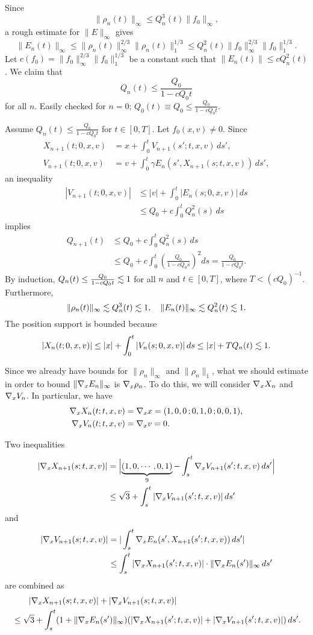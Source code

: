 \documentclass[11pt]{amsart}
\begin{document}
\begin{pfs}
\item
Since
\[\|\rho_n(t)\|_\infty\le Q_n^3(t)\|f_0\|_\infty,\]
a rough estimate for $\|E\|_\infty$ gives
\[\|E_n(t)\|_\infty\le\|\rho_n(t)\|_\infty^{2/3}\|\rho_n(t)\|_1^{1/3}\le Q_n^2(t)\|f_0\|_\infty^{2/3}\|f_0\|_1^{1/3}.\]
Let $c(f_0)=\|f_0\|_\infty^{2/3}\|f_0\|_1^{1/3}$ be a constant such that $\|E_n(t)\|\le cQ_n^2(t)$.
We claim that
\[Q_n(t)\le\frac{Q_0}{1-cQ_0t}\]
for all $n$.
Easily checked for $n=0$; $Q_0(t)\equiv Q_0\le\frac{Q_0}{1-cQ_0t}$.

Assume $Q_n(t)\le\frac{Q_0}{1-cQ_0t}$ for $t\in[0,T]$.
Let $f_0(x,v)\ne0$.
Since
\begin{align*}
X_{n+1}(t;0,x,v)&=x+\int_0^tV_{n+1}(s';t,x,v)\,ds',\\
V_{n+1}(t;0,x,v)&=v+\int_0^t\gamma E_n(s',X_{n+1}(s;t,x,v))\,ds',
\end{align*}
an inequality
\begin{align*}
|V_{n+1}(t;0,x,v)|
&\le|v|+\int_0^t|E_n(s;0,x,v)|\,ds\\
&\le Q_0+c\int_0^tQ_n^2(s)\,ds
\end{align*}
implies
\begin{align*}
Q_{n+1}(t)
&\le Q_0+c\int_0^tQ_n^2(s)\,ds\\
&\le Q_0+c\int_0^t\left(\frac{Q_0}{1-cQ_0s}\right)^2ds
=\frac{Q_0}{1-cQ_0t}.
\end{align*}
By induction, $Q_n(t)\le\frac{Q_0}{1-cQ_0t}\lesssim1$ for all $n$ and $t\in[0,T]$, where $T<(cQ_0)^{-1}$.
Furthermore,
\[\|\rho_n(t)\|_\infty\lesssim Q_n^3(t)\lesssim1,\quad\|E_n(t)\|_\infty\lesssim Q_n^2(t)\lesssim1.\]
The position support is bounded because
\[|X_n(t;0,x,v)|\le|x|+\int_0^t|V_n(s;0,x,v)|\,ds\le|x|+TQ_n(t)\lesssim1.\]

\item
Since we already have bounds for $\|\rho_n\|_\infty$ and $\|\rho_n\|_1$, what we should estimate in order to bound $\|\nabla_xE_n\|_\infty$ is $\nabla_x\rho_n$.
To do this, we will consider $\nabla_xX_n$ and $\nabla_xV_n$.
In particular, we have
\begin{align*}
\nabla_xX_n(t;t,x,v)&=\nabla_xx=(1,0,0\,;0,1,0\,;0,0,1),\\
\nabla_xV_n(t;t,x,v)&=\nabla_xv=0.
\end{align*}

Two inequalities
\begin{align*}
|\nabla_xX_{n+1}(s;t,x,v)|
&=\Bigl|\underbrace{(1,0,\cdots,0,1)}_{9}-\int_s^t\nabla_xV_{n+1}(s';t,x,v)\,ds'\Bigr|\\
&\le\sqrt3+\int_s^t|\nabla_xV_{n+1}(s';t,x,v)|\,ds'
\end{align*}
and
\begin{align*}
|\nabla_xV_{n+1}(s;t,x,v)|
&=|\int_s^t\nabla_xE_n(s',X_{n+1}(s';t,x,v))\,ds'|\\
&\le\int_s^t|\nabla_xX_{n+1}(s';t,x,v)|\cdot\|\nabla_xE_n(s')\|_\infty\,ds'
\end{align*}
are combined as
\begin{align*}
&\qquad|\nabla_xX_{n+1}(s;t,x,v)|+|\nabla_xV_{n+1}(s;t,x,v)|\\
&\le\sqrt3+\int_s^t(1+\|\nabla_xE_n(s')\|_\infty)(|\nabla_xX_{n+1}(s';t,x,v)|+|\nabla_xV_{n+1}(s';t,x,v)|)\,ds'.
\end{align*}


\end{pfs}
\end{document}
